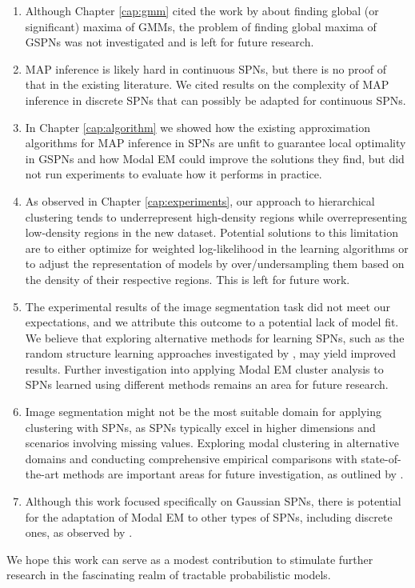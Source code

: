 \begin{enumerate}
  \item Although Chapter \ref{cap:gmm} cited the work by \citet{Pulkkinen2014} about finding global (or significant) maxima of GMMs, the problem of finding global maxima of GSPNs was not investigated and is left for future research.
  \item MAP inference is likely hard in continuous SPNs, but there is no proof of that in the existing literature. We cited results on the complexity of MAP inference in discrete SPNs \citep{Peharz2015, Peharz2016, Conaty2017} that can possibly be adapted for continuous SPNs.
  \item In Chapter \ref{cap:algorithm} we showed how the existing approximation algorithms for MAP inference in SPNs are unfit to guarantee local optimality in GSPNs and how Modal EM could improve the solutions they find, but did not run experiments to evaluate how it performs in practice.
  \item As observed in Chapter \ref{cap:experiments}, our approach to hierarchical clustering tends to underrepresent high-density regions while overrepresenting low-density regions in the new dataset. Potential solutions to this limitation are to either optimize for weighted log-likelihood in the learning algorithms or to adjust the representation of models by over/undersampling them based on the density of their respective regions. This is left for future work.
  \item The experimental results of the image segmentation task did not meet our expectations, and we attribute this outcome to a potential lack of model fit. We believe that exploring alternative methods for learning SPNs, such as the random structure learning approaches investigated by \citet{Peharz2020, Geh2021}, may yield improved results. Further investigation into applying Modal EM cluster analysis to SPNs learned using different methods remains an area for future research.
  \item Image segmentation might not be the most suitable domain for applying clustering with SPNs, as SPNs typically excel in higher dimensions and scenarios involving missing values. Exploring modal clustering in alternative domains and conducting comprehensive empirical comparisons with state-of-the-art methods are important areas for future investigation, as outlined by \citet{Madeira2023}.
  \item Although this work focused specifically on Gaussian SPNs, there is potential for the adaptation of Modal EM to other types of SPNs, including discrete ones, as observed by \citet{Madeira2022}.
\end{enumerate}

We hope this work can serve as a modest contribution to stimulate further research in the fascinating realm of tractable probabilistic models.
